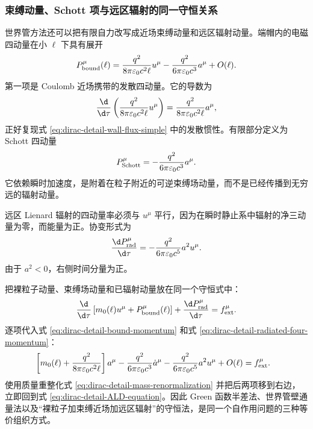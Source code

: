 \subsubsection{束缚动量、Schott 项与远区辐射的同一守恒关系}

世界管方法还可以把有限自力改写成近场束缚动量和远区辐射动量。端帽内的电磁四动量在小 $\ell$ 下具有展开
\begin{equation}
 P_{\mathrm{bound}}^\mu(\ell)
 ={q^2\over8\pi\varepsilon_0c^2\ell}u^\mu
 -{q^2\over6\pi\varepsilon_0c^3}a^\mu
 +O(\ell).
 \label{eq:dirac-detail-bound-momentum}
\end{equation}
第一项是 Coulomb 近场携带的发散四动量。它的导数为
\begin{equation*}
 {\d\over\d\tau}
 \left({q^2\over8\pi\varepsilon_0c^2\ell}u^\mu\right)
 ={q^2\over8\pi\varepsilon_0c^2\ell}a^\mu,
\end{equation*}
正好复现式 \eqref{eq:dirac-detail-wall-flux-simple} 中的发散惯性。有限部分定义为 Schott 四动量
\begin{equation}
 P_{\mathrm{Schott}}^\mu
 =-{q^2\over6\pi\varepsilon_0c^3}a^\mu.
 \label{eq:dirac-detail-Schott-momentum}
\end{equation}
它依赖瞬时加速度，是附着在粒子附近的可逆束缚场动量，而不是已经传播到无穷远的辐射动量。

远区 Lienard 辐射的四动量率必须与 $u^\mu$ 平行，因为在瞬时静止系中辐射的净三动量为零，而能量为正。协变形式为
\begin{equation}
 {\d P_{\mathrm{rad}}^\mu\over\d\tau}
 =-{q^2\over6\pi\varepsilon_0c^5}a^2u^\mu.
 \label{eq:dirac-detail-radiated-four-momentum}
\end{equation}
由于 $a^2<0$，右侧时间分量为正。

把裸粒子动量、束缚场动量和已辐射动量放在同一个守恒式中：
\begin{equation}
 {\d\over\d\tau}
 \left[m_0(\ell)u^\mu
 +P_{\mathrm{bound}}^\mu(\ell)\right]
 +{\d P_{\mathrm{rad}}^\mu\over\d\tau}
 =f_{\mathrm{ext}}^\mu.
 \label{eq:dirac-detail-total-balance}
\end{equation}
逐项代入式 \eqref{eq:dirac-detail-bound-momentum} 和式 \eqref{eq:dirac-detail-radiated-four-momentum}：
\begin{align}
 &\left[m_0(\ell)
 +{q^2\over8\pi\varepsilon_0c^2\ell}\right]a^\mu
 -{q^2\over6\pi\varepsilon_0c^3}\dot a^\mu
 -{q^2\over6\pi\varepsilon_0c^5}a^2u^\mu
 +O(\ell)
 =f_{\mathrm{ext}}^\mu.
 \label{eq:dirac-detail-balance-expanded}
\end{align}
使用质量重整化式 \eqref{eq:dirac-detail-mass-renormalization} 并把后两项移到右边，立即回到式 \eqref{eq:dirac-detail-ALD-equation}。因此 Green 函数半差法、世界管壁通量法以及“裸粒子加束缚近场加远区辐射”的守恒法，是同一个自作用问题的三种等价组织方式。

